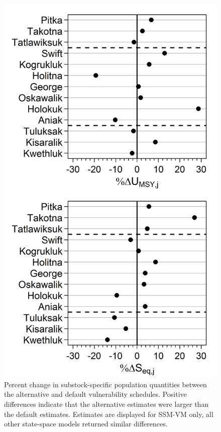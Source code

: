 \documentclass[12pt,]{book}
\theoremstyle{definition}
\theoremstyle{definition}
\theoremstyle{definition}
\theoremstyle{remark}
\begin{document}
\begin{figure}
  \centering
  \includegraphics{img/Ch4/alt-vuln-ests.jpg}
  \caption{Percent change in substock-specific population quantities between the alternative and default vulnerability schedules. Positive differences indicate that the alternative estimates were larger than the default estimates. Estimates are displayed for SSM-VM only, all other state-space models returned similar differences.}
  \label{fig:alt-vuln-ests}
\end{figure}
\end{document}
